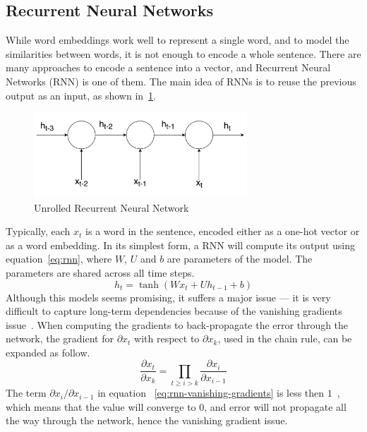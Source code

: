 \subsection{\label{ssec:rnn}Recurrent Neural Networks}
While word embeddings work well to represent a single word, and to model the
similarities between words, it is not enough to encode a whole sentence. There
are many approaches to encode a sentence into a vector, and Recurrent Neural
Networks (RNN) is one of them. The main idea of RNNs is to reuse the previous
output as an input, as shown in~\ref{fig:rnn}.
\begin{figure}[tb]
  \begin{center}
    \includegraphics[width=8cm]{./images/rnn.pdf}
    \caption{\label{fig:rnn}Unrolled Recurrent Neural Network}
  \end{center}
\end{figure}
Typically, each $x_t$ is a word in the sentence, encoded either as a
one-hot vector or as a word embedding. In its simplest form, a RNN will compute
its output using equation~\ref{eq:rnn}, where $W$, $U$ and $b$ are parameters of
the model. The parameters are shared across all time steps.
\begin{equation}
  h_t = \tanh\left( W x_t + U h_{t - 1} + b \right) \label{eq:rnn}
\end{equation}
Although this models seems promising, it suffers a major issue --- it is very
difficult to capture long-term dependencies because of the vanishing gradients
issue~\cite{pascanu2013difficulty}. When computing the gradients to
back-propagate the error through the network, the gradient for $\partial x_t$
with respect to $\partial x_k$, used in the chain rule, can be expanded as
follow.
\begin{equation}
  \frac{\partial x_t}{\partial x_k} = \prod_{t \geq i > k} \frac{\partial x_i}{\partial x_{i-1}}
  \label{eq:rnn-vanishing-gradients}
\end{equation}
The term $\partial x_i/\partial x_{i-1}$ in equation~%
\ref{eq:rnn-vanishing-gradients} is less then $1$~\cite{pascanu2013difficulty},
which means that the value will converge to $0$, and error will not propagate
all the way through the network, hence the vanishing gradient issue.

